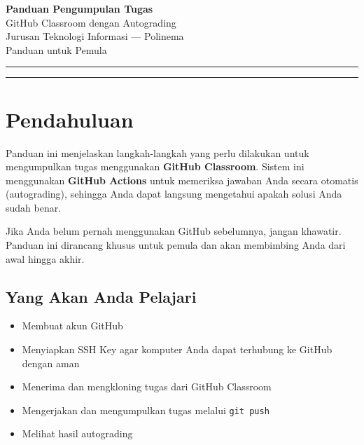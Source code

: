 \documentclass[
    a4paper,
    11pt,
    parskip=half
]{scrartcl}
\begin{document}
\begin{center}
    {\LARGE\bfseries Panduan Pengumpulan Tugas}\\[0.4em]
    {\large GitHub Classroom dengan Autograding}\\[0.3em]
    {\normalsize Jurusan Teknologi Informasi --- Polinema}\\[0.2em]
    {\small\color{gray} Panduan untuk Pemula}
\end{center}

\vspace{0.5em}
\hrule
\vspace{1em}

\tableofcontents

\vspace{1em}
\hrule
\vspace{1em}

\section{Pendahuluan}

Panduan ini menjelaskan langkah-langkah yang perlu dilakukan untuk mengumpulkan tugas menggunakan \textbf{GitHub Classroom}. Sistem ini menggunakan \textbf{GitHub Actions} untuk memeriksa jawaban Anda secara otomatis (autograding), sehingga Anda dapat langsung mengetahui apakah solusi Anda sudah benar.

\begin{notebox}
Jika Anda belum pernah menggunakan GitHub sebelumnya, jangan khawatir. Panduan ini dirancang khusus untuk pemula dan akan membimbing Anda dari awal hingga akhir.
\end{notebox}

\subsection{Yang Akan Anda Pelajari}

\begin{itemize}
    \item Membuat akun GitHub
    \item Menyiapkan SSH Key agar komputer Anda dapat terhubung ke GitHub dengan aman
    \item Menerima dan mengkloning tugas dari GitHub Classroom
    \item Mengerjakan dan mengumpulkan tugas melalui \texttt{git push}
    \item Melihat hasil autograding
\end{itemize}
\end{document}
